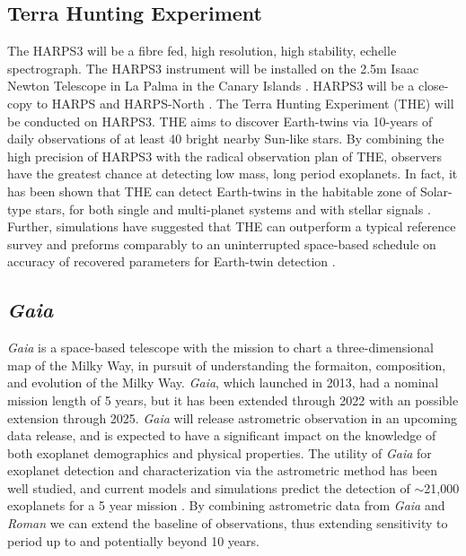 \documentclass[twocolumn]{aastex631}
\begin{document}
\subsection{Terra Hunting Experiment}
The HARPS3 will be a fibre fed, high resolution, high stability, echelle spectrograph. The HARPS3 instrument will be installed on the 2.5m Isaac Newton Telescope in La Palma in the Canary Islands \citep{Thompson2016, Hall2016}. HARPS3 will be a close-copy to HARPS \citep{Mayor2003, Rupprecht2004} and HARPS-North \citep{Cosentino2012}. The Terra Hunting Experiment (THE) will be conducted on HARPS3. THE aims to discover Earth-twins via 10-years of daily observations of at least 40 bright nearby Sun-like stars. By combining the high precision of HARPS3 with the radical observation plan of THE, observers have the greatest chance at detecting low mass, long period exoplanets.
In fact, it has been shown that THE can detect Earth-twins in the habitable zone of Solar-type stars, for both single and multi-planet systems and with stellar signals \citep{Hall2018}.
Further, simulations have suggested that THE can outperform a typical reference survey and preforms comparably to an uninterrupted space-based schedule on accuracy of recovered parameters for Earth-twin detection \citep{Hall2018}. 


\subsection{\textit{Gaia}}
\textit{Gaia} is a space-based telescope with the mission to chart a three-dimensional map of the Milky Way, in pursuit of understanding the formaiton, composition, and evolution of the Milky Way. \textit{Gaia}, which launched in 2013, had a nominal mission length of 5 years, but it has been extended through 2022 with an possible extension through 2025. \textit{Gaia} will release astrometric observation in an upcoming data release, and is expected to have a significant impact on the knowledge of both exoplanet demographics and physical properties. The utility of \textit{Gaia} for exoplanet detection and characterization via the astrometric method has been well studied, and current models and simulations predict the detection of $\sim$21,000 exoplanets for a 5 year mission \citep{Bernstein1995, Casertano1996, Casertano2008, Perryman2014, Ranalli2018}. By combining astrometric data from \textit{Gaia} and \textit{Roman} we can extend the baseline of observations, thus extending sensitivity to period up to and potentially beyond 10 years.
\end{document}
